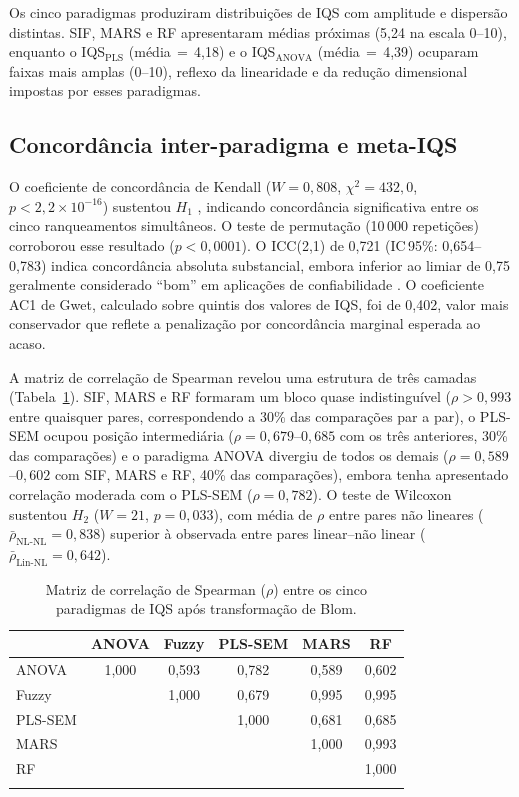 \documentclass[pdflatex,sn-basic]{sn-jnl}%
\begin{document}
Os cinco paradigmas produziram distribuições de IQS com amplitude e dispersão distintas. SIF, MARS e RF apresentaram médias próximas (5,24 na escala 0--10), enquanto o IQS$_{\text{PLS}}$ (média\,$=$\,4,18) e o IQS$_{\text{ANOVA}}$ (média\,$=$\,4,39) ocuparam faixas mais amplas (0--10), reflexo da linearidade e da redução dimensional impostas por esses paradigmas.

\subsection{Concordância inter-paradigma e meta-IQS}\label{subsec:concordance_disc}

O coeficiente de concordância de Kendall ($W = 0{,}808$, $\chi^2 = 432{,}0$, $p < 2{,}2 \times 10^{-16}$) sustentou $H_1$ \cite{Legendre2012}, indicando concordância significativa entre os cinco ranqueamentos simultâneos. O teste de permutação (10\,000 repetições) corroborou esse resultado ($p < 0{,}0001$). O ICC(2,1) de 0,721 (IC\,95\%: 0,654--0,783) indica concordância absoluta substancial, embora inferior ao limiar de 0,75 geralmente considerado ``bom'' em aplicações de confiabilidade \cite{Koo2016}. O coeficiente AC1 de Gwet, calculado sobre quintis dos valores de IQS, foi de 0,402, valor mais conservador que reflete a penalização por concordância marginal esperada ao acaso.

A matriz de correlação de Spearman revelou uma estrutura de três camadas (Tabela~\ref{tab:spearman}). SIF, MARS e RF formaram um bloco quase indistinguível ($\rho > 0{,}993$ entre quaisquer pares, correspondendo a 30\% das comparações par a par), o PLS-SEM ocupou posição intermediária ($\rho = 0{,}679$--$0{,}685$ com os três anteriores, 30\% das comparações) e o paradigma ANOVA divergiu de todos os demais ($\rho = 0{,}589$--$0{,}602$ com SIF, MARS e RF, 40\% das comparações), embora tenha apresentado correlação moderada com o PLS-SEM ($\rho = 0{,}782$). O teste de Wilcoxon sustentou $H_2$ ($W = 21$, $p = 0{,}033$), com média de $\rho$ entre pares não lineares ($\bar{\rho}_{\text{NL-NL}} = 0{,}838$) superior à observada entre pares linear--não linear ($\bar{\rho}_{\text{Lin-NL}} = 0{,}642$).

\begin{table}[ht]
\caption{Matriz de correlação de Spearman ($\rho$) entre os cinco paradigmas de IQS após transformação de Blom.}\label{tab:spearman}
\begin{tabular*}{\textwidth}{@{\extracolsep\fill}lccccc}
\toprule
 & ANOVA & Fuzzy & PLS-SEM & MARS & RF \\
\midrule
ANOVA   & 1,000 & 0,593 & 0,782 & 0,589 & 0,602 \\
Fuzzy   &       & 1,000 & 0,679 & 0,995 & 0,995 \\
PLS-SEM &       &       & 1,000 & 0,681 & 0,685 \\
MARS    &       &       &       & 1,000 & 0,993 \\
RF      &       &       &       &       & 1,000 \\
\botrule
\end{tabular*}
\end{table}
\end{document}

